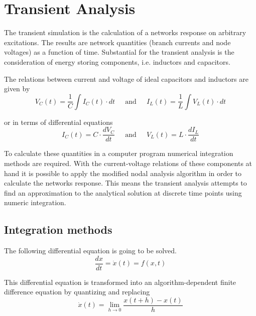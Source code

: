 %
%

\chapter{Transient Analysis}

The transient simulation is the calculation of a networks response on
arbitrary excitations.  The results are network quantities (branch
currents and node voltages) as a function of time.  Substantial for
the transient analysis is the consideration of energy storing
components, i.e. inductors and capacitors.

\addvspace{12pt}

The relations between current and voltage of ideal capacitors and
inductors are given by
\begin{equation}
V_C(t) = \dfrac{1}{C}\int I_C(t) \cdot dt
\;\;\;\; \textrm{ and } \;\;\;\;
I_L(t) = \dfrac{1}{L}\int V_L(t) \cdot dt
\end{equation}

or in terms of differential equations
\begin{equation}
I_C(t) = C\cdot \dfrac{d V_C}{d t}
\;\;\;\; \textrm{ and } \;\;\;\;
V_L(t) = L\cdot \dfrac{d I_L}{d t}
\end{equation}

To calculate these quantities in a computer program numerical
integration methods are required.  With the current-voltage relations
of these components at hand it is possible to apply the modified nodal
analysis algorithm in order to calculate the networks response.  This
means the transient analysis attempts to find an approximation to the
analytical solution at discrete time points using numeric integration.

\section{Integration methods}
\label{sec:IntegrationMethods}

The following differential equation is going to be solved.
\begin{equation}
\dfrac{d x}{d t} = \dot{x}(t) = f(x,t)
\label{eq:IntEquation}
\end{equation}

This differential equation is transformed into an algorithm-dependent
finite difference equation by quantizing and replacing
\begin{equation}
\dot{x}(t) = \lim_{h \rightarrow 0} \dfrac{x(t+h) - x(t)}{h}
\end{equation}

